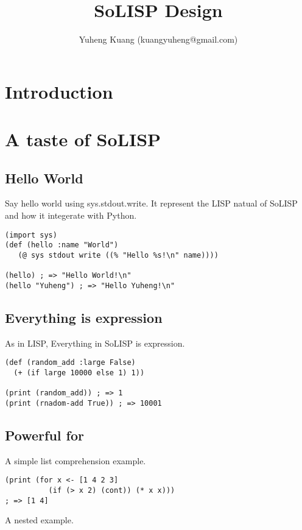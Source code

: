 \documentclass[a4paper,11pt]{article}
\title{SoLISP Design}
\author{Yuheng Kuang (kuangyuheng@gmail.com)}
\begin{document}
\maketitle

\section{Introduction}


\section{A taste of SoLISP}


\subsection{Hello World}

Say hello world using sys.stdout.write. It represent the LISP natual of SoLISP and how it integerate with Python.

\begin{verbatim}
(import sys)
(def (hello :name "World")
   (@ sys stdout write ((% "Hello %s!\n" name))))

(hello) ; => "Hello World!\n"
(hello "Yuheng") ; => "Hello Yuheng!\n"
\end{verbatim}


\subsection{Everything is expression}

As in LISP, Everything in SoLISP is expression.

\begin{verbatim}
(def (random_add :large False)
  (+ (if large 10000 else 1) 1))

(print (random_add)) ; => 1
(print (rnadom-add True)) ; => 10001
\end{verbatim}


\subsection{Powerful for}

A simple list comprehension example.

\begin{verbatim}
(print (for x <- [1 4 2 3]
          (if (> x 2) (cont)) (* x x)))
; => [1 4]
\end{verbatim}

A nested example.
\end{document}
